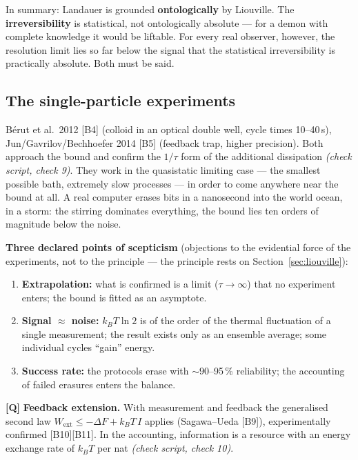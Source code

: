 In summary: Landauer is grounded \textbf{ontologically} by Liouville. The
\textbf{irreversibility} is statistical, not ontologically absolute --- for a
demon with complete knowledge it would be liftable. For every real observer,
however, the resolution limit lies so far below the signal that the statistical
irreversibility is practically absolute. Both must be said.

\subsection{The single-particle experiments}

Bérut et al.\ 2012 [B4] (colloid in an optical double well, cycle times
10--40\,s), Jun/Gavrilov/Bechhoefer 2014 [B5] (feedback trap, higher precision).
Both approach the bound and confirm the $1/\tau$ form of the additional
dissipation \emph{(check script, check 9)}. They work in the quasistatic limiting case --- the
smallest possible bath, extremely slow processes --- in order to come anywhere near
the bound at all. A real computer erases bits in a nanosecond into the world ocean,
in a storm: the stirring dominates everything, the bound lies ten orders of
magnitude below the noise.

\textbf{Three declared points of scepticism} (objections to the evidential force
of the experiments, not to the principle --- the principle rests on
Section~\ref{sec:liouville}):

\begin{enumerate}[leftmargin=1.6em,itemsep=0.25em]
  \item \textbf{Extrapolation:} what is confirmed is a limit ($\tau\to\infty$)
        that no experiment enters; the bound is fitted as an asymptote.
  \item \textbf{Signal $\approx$ noise:} $k_B T \ln 2$ is of the order of the
        thermal fluctuation of a single measurement; the result exists only as an
        ensemble average; some individual cycles “gain” energy.
  \item \textbf{Success rate:} the protocols erase with ${\sim}90$--95\,\%
        reliability; the accounting of failed erasures enters the balance.
\end{enumerate}

\textbf{[Q]} \textbf{Feedback extension.} With measurement and feedback the generalised
second law $W_{\text{ext}} \le -\Delta F + k_B T\,I$ applies (Sagawa--Ueda [B9]),
experimentally confirmed [B10][B11]. In the accounting, information is a resource
with an energy exchange rate of $k_B T$ per nat \emph{(check script, check 10)}.

